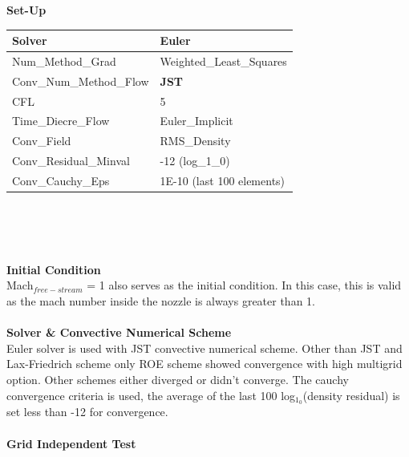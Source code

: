 \begin{flushleft}
\textbf{Set-Up}\\
\end{flushleft}
\begin{center}
\begin{tabular}{|l|l|}
     \hline
     Solver & Euler  \\
     \hline
     Num\_Method\_Grad & Weighted\_Least\_Squares  \\
     \hline
    Conv\_Num\_Method\_Flow & \textbf{JST}  \\
     \hline
    CFL & 5\\
     \hline
     Time\_Diecre\_Flow & Euler\_Implicit\\
     \hline
    Conv\_Field & RMS\_Density\\
     \hline 
    Conv\_Residual\_Minval & -12 (log_1_0)\\
     \hline 
    Conv\_Cauchy\_Eps & 1E-10 (last 100 elements)\\
     \hline
\end{tabular}\\
\end{center}
\\
\\
\textbf{Initial Condition}\\
Mach$_{free-stream}$ = 1 also serves as the initial condition. In this case, this is valid as the mach number inside the nozzle is always greater than 1.\\
\\
\textbf{Solver \& Convective Numerical Scheme}\\
Euler solver is used with JST convective numerical scheme. Other than JST and Lax-Friedrich scheme only ROE scheme showed convergence with high multigrid option. Other schemes either diverged or didn't converge. The cauchy convergence criteria is used, the average of the last 100 log$_1_0$(density residual) is set less than -12 for convergence. \\
\\
\textbf{Grid Independent Test}\\
